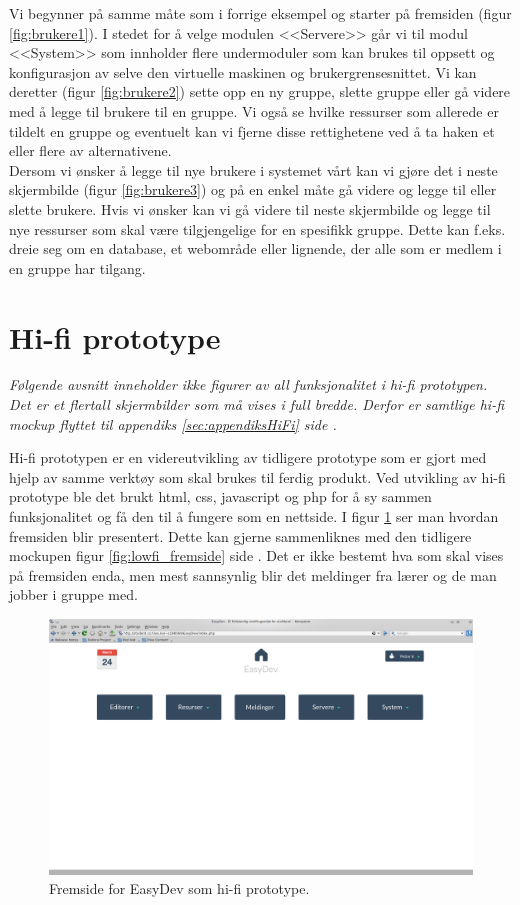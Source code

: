 Vi begynner på samme måte som i forrige eksempel og starter på fremsiden (figur \ref{fig:brukere1}). I stedet for å velge modulen <<Servere>> går vi til modul <<System>> som innholder flere undermoduler som kan brukes til oppsett og konfigurasjon av selve den virtuelle maskinen og brukergrensesnittet. 
Vi kan deretter (figur \ref{fig:brukere2}) sette opp en ny gruppe, slette gruppe eller gå videre med å legge til brukere til en gruppe. Vi også se hvilke ressurser som allerede er tildelt en gruppe og eventuelt kan vi fjerne disse rettighetene ved å ta haken et eller flere av alternativene.\\
Dersom vi ønsker å legge til nye brukere i systemet vårt kan vi gjøre det i neste skjermbilde (figur \ref{fig:brukere3}) og på en enkel måte gå videre og legge til eller slette brukere.
Hvis vi ønsker kan vi gå videre til neste skjermbilde og legge til nye ressurser som skal være tilgjengelige for en spesifikk gruppe. Dette kan f.eks. dreie seg om en database, et webområde eller lignende, der alle som er medlem i en gruppe har tilgang.

\section{Hi-fi prototype}
\emph{Følgende avsnitt inneholder ikke figurer av all funksjonalitet i hi-fi prototypen. Det er et flertall skjermbilder som må vises i full bredde. Derfor er samtlige hi-fi mockup flyttet til appendiks \ref{sec:appendiksHiFi} side \pageref{sec:appendiksHiFi}.}

Hi-fi prototypen er en videreutvikling av tidligere prototype som er gjort med hjelp av samme verktøy som skal brukes til ferdig produkt. Ved utvikling av hi-fi prototype ble det brukt  html, css, javascript og php for å sy sammen funksjonalitet og få den til å fungere som en nettside. I figur \ref{fig:hifi_fremside} ser man hvordan fremsiden blir presentert. Dette kan gjerne sammenliknes med den tidligere mockupen figur \ref{fig:lowfi_fremside} side \pageref{fig:lowfi_fremside}. Det er ikke bestemt hva som skal vises på fremsiden enda, men mest sannsynlig blir det meldinger fra lærer og de man jobber i gruppe med.
\begin{figure}[ht]
\includegraphics[width=\textwidth,height=\textheight,keepaspectratio]{./img/prosessdokumentasjon/hifi/fremside.png}
\caption[Hi-fi prototype]{Fremside for EasyDev som hi-fi prototype.}
\label{fig:hifi_fremside}
\end{figure}

